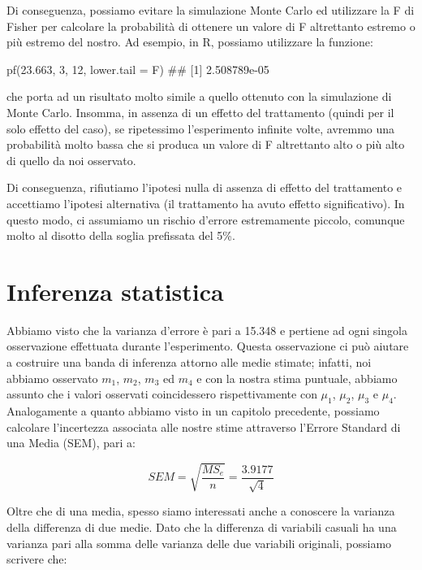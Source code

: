 \documentclass[a4paper,12pt,oneside]{book}
\newenvironment{Shaded}{\begin{snugshade}}{\end{snugshade}}
\newcommand{\DecValTok}[1]{#1}
\newcommand{\FloatTok}[1]{#1}
\newcommand{\DocumentationTok}[1]{#1}
\newcommand{\FunctionTok}[1]{#1}
\newcommand{\AttributeTok}[1]{#1}
\newcommand{\NormalTok}[1]{#1}
\begin{document}
Di conseguenza, possiamo evitare la simulazione Monte Carlo ed utilizzare la F di Fisher per calcolare la probabilità di ottenere un valore di F altrettanto estremo o più estremo del nostro. Ad esempio, in R, possiamo utilizzare la funzione:

\begin{Shaded}
\begin{Highlighting}[]
\FunctionTok{pf}\NormalTok{(}\FloatTok{23.663}\NormalTok{, }\DecValTok{3}\NormalTok{, }\DecValTok{12}\NormalTok{, }\AttributeTok{lower.tail =}\NormalTok{ F)}
\DocumentationTok{\#\# [1] 2.508789e{-}05}
\end{Highlighting}
\end{Shaded}

che porta ad un risultato molto simile a quello ottenuto con la simulazione di Monte Carlo. Insomma, in assenza di un effetto del trattamento (quindi per il solo effetto del caso), se ripetessimo l'esperimento infinite volte, avremmo una probabilità molto bassa che si produca un valore di F altrettanto alto o più alto di quello da noi osservato.

Di conseguenza, rifiutiamo l'ipotesi nulla di assenza di effetto del trattamento e accettiamo l'ipotesi alternativa (il trattamento ha avuto effetto significativo). In questo modo, ci assumiamo un rischio d'errore estremamente piccolo, comunque molto al disotto della soglia prefissata del 5\%.

\hypertarget{inferenza-statistica}{%
\section{Inferenza statistica}\label{inferenza-statistica}}

Abbiamo visto che la varianza d'errore è pari a 15.348 e pertiene ad ogni singola osservazione effettuata durante l'esperimento. Questa osservazione ci può aiutare a costruire una banda di inferenza attorno alle medie stimate; infatti, noi abbiamo osservato \(m_1\), \(m_2\), \(m_3\) ed \(m_4\) e con la nostra stima puntuale, abbiamo assunto che i valori osservati coincidessero rispettivamente con \(\mu_1\), \(\mu_2\), \(\mu_3\) e \(\mu_4\). Analogamente a quanto abbiamo visto in un capitolo precedente, possiamo calcolare l'incertezza associata alle nostre stime attraverso l'Errore Standard di una Media (SEM), pari a:

\[SEM = \sqrt{ \frac{MS_e}{n} } =  \frac{3.9177}{\sqrt{4}}\]

Oltre che di una media, spesso siamo interessati anche a conoscere la varianza della differenza di due medie. Dato che la differenza di variabili casuali ha una varianza pari alla somma delle varianza delle due variabili originali, possiamo scrivere che:
\end{document}
